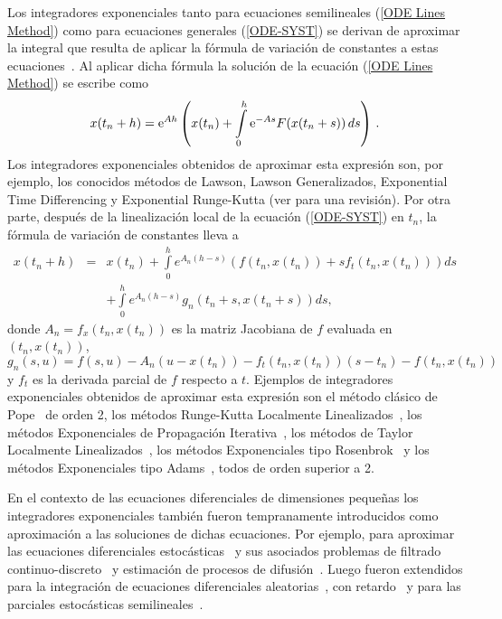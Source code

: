 Los integradores exponenciales tanto para ecuaciones semilineales (\ref{ODE Lines Method}) como para ecuaciones generales (\ref{ODE-SYST}) se derivan de aproximar la integral
que resulta de aplicar la fórmula de variación de constantes a estas ecuaciones~\cite{jimenez2020}. Al aplicar dicha fórmula la solución de la ecuación (\ref{ODE Lines Method}) se escribe como
\begin{equation}
x(t_n+h)=\mathrm{e}^{Ah}\left(x(t_n) +\int\limits_{0}^{h} \mathrm{e}^{-As}F(x(t_n+s)) \,ds\right)\,. \label{VCF2}
\end{equation}
Los integradores exponenciales obtenidos de aproximar esta expresión son, por ejemplo, los conocidos métodos de Lawson, Lawson Generalizados, Exponential Time
Differencing y Exponential Runge-Kutta (ver \cite{Berland07} para una revisión). Por otra parte, después de la linealización local de la ecuación (\ref{ODE-SYST}) en $t_{n}$,  la fórmula de variación de constantes lleva a
\begin{eqnarray}
x(t_{n}+h) &= & x(t_{n})+\int\limits_{0}^{h}e^{A	_{n}(h-s)}(f(t_n,x(t_{n}))+sf_t(t_n,x(t_{n})))ds \nonumber \\
 & & +\int\limits_{0}^{h}e^{A
	_{n}(h-s)}g_{n}(t_{n}+s,x(t_{n}+s))ds, \label{VCF}
\end{eqnarray}
donde $A_{n}=f_x(t_n,x(t_{n}))$ es la matriz Jacobiana de $f$ evaluada en $(t_n,x(t_{n}))$,  $g_{n}(s,u)=f(s,u)-A_{n}(u-x(t_n))-f_t(t_n,x(t_{n}))(s-t_n)-f(t_n,x(t_n))$ y $f_t$ es la derivada parcial de $f$ respecto a $t$. 
Ejemplos de integradores exponenciales obtenidos de aproximar esta expresión son el método clásico de Pope~\cite{pope1963exponential} de orden 2, los métodos Runge-Kutta Localmente 
Linealizados~\cite{delaCruz06,Jimenez13,Jimenez14AMC}, los métodos Exponenciales de Propagación 
Iterativa~\cite{tokman2006efficient, tokman2012new}, los métodos de Taylor Localmente Linealizados~\cite{delaCruz07}, los
métodos Exponenciales tipo Rosenbrok~\cite{hochbruck2009exponential} y los métodos Exponenciales tipo Adams~\cite{hochbruck2011exponential}, todos de orden superior a 2.

En el contexto de las ecuaciones diferenciales de dimensiones pequeñas los integradores exponenciales también fueron tempranamente introducidos como aproximación a las soluciones de dichas ecuaciones. Por ejemplo, para aproximar las ecuaciones diferenciales estocásticas~\cite{ozaki19852,ozaki1985statistical} y sus asociados problemas de filtrado continuo-discreto~\cite{ozaki1993local} y estimación de procesos de difusión~\cite{ozaki19852,ozaki1985statistical,ozaki1994local}. Luego fueron extendidos para la integración de ecuaciones diferenciales aleatorias~\cite{carbonell2005local}, con retardo~\cite{jimenez2006local} y para las parciales estocásticas semilineales~\cite{jentzen2009overcoming,kloeden2011exponential}.

